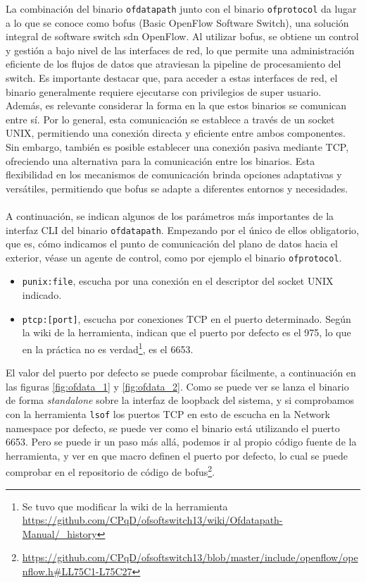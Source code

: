La combinación del binario \texttt{ofdatapath} junto con el binario \texttt{ofprotocol} da lugar a lo que se conoce como \gls{bofus} (Basic OpenFlow Software Switch), una solución integral de software switch \gls{sdn} OpenFlow. Al utilizar \gls{bofus}, se obtiene un control y gestión a bajo nivel de las interfaces de red, lo que permite una administración eficiente de los flujos de datos que atraviesan la pipeline de procesamiento del switch. Es importante destacar que, para acceder a estas interfaces de red, el binario generalmente requiere ejecutarse con privilegios de super usuario. Además, es relevante considerar la forma en la que estos binarios se comunican entre sí. Por lo general, esta comunicación se establece a través de un socket UNIX, permitiendo una conexión directa y eficiente entre ambos componentes. Sin embargo, también es posible establecer una conexión pasiva mediante TCP, ofreciendo una alternativa para la comunicación entre los binarios. Esta flexibilidad en los mecanismos de comunicación brinda opciones adaptativas y versátiles, permitiendo que \gls{bofus} se adapte a diferentes entornos y necesidades. \\
\\
A continuación, se indican algunos de los parámetros más importantes de la interfaz CLI del binario \texttt{ofdatapath}. Empezando por el único de ellos obligatorio, que es, cómo indicamos el punto de comunicación del plano de datos hacia el exterior, véase un agente de control, como por ejemplo el binario \texttt{ofprotocol}.\\

\begin{itemize}
    \item \texttt{punix:file}, escucha por una conexión en el descriptor del socket UNIX indicado.

    \item \texttt{ptcp:[port]}, escucha por conexiones TCP en el puerto determinado. Según la wiki de la herramienta, indican que el puerto por defecto es el 975, lo que en la práctica no es verdad\footnote{Se tuvo que modificar la wiki de la herramienta \url{https://github.com/CPqD/ofsoftswitch13/wiki/Ofdatapath-Manual/_history}}, es el 6653.
\end{itemize}

El valor del puerto por defecto se puede comprobar fácilmente, a continuación en las figuras \ref{fig:ofdata_1} y \ref{fig:ofdata_2}. Como se puede ver se lanza el binario de forma \textit{standalone} sobre la interfaz de loopback del sistema, y si comprobamos con la herramienta \texttt{lsof} los puertos TCP en esto de escucha en la Network namespace por defecto, se puede ver como el binario está utilizando el puerto 6653. Pero se puede ir un paso más allá, podemos ir al propio código fuente de la herramienta, y ver en que macro definen el puerto por defecto, lo cual se puede comprobar en el repositorio de código de \gls{bofus}\footnote{\url{https://github.com/CPqD/ofsoftswitch13/blob/master/include/openflow/openflow.h\#LL75C1-L75C27}}.

